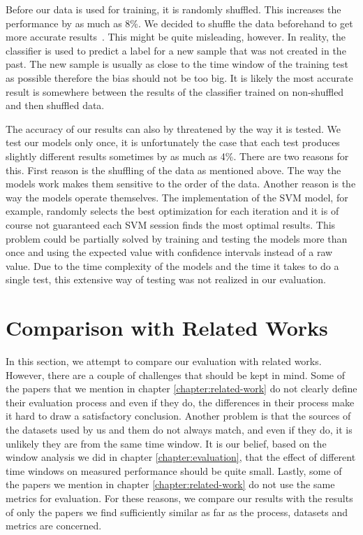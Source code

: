 Before our data is used for training, it is randomly shuffled. This increases the performance by as much as 8\%. We decided to shuffle the data beforehand to get more accurate results~. This might be quite misleading, however. In reality, the classifier is used to predict a label for a new sample that was not created in the past. The new sample is usually as close to the time window of the training test as possible therefore the bias should not be too big. It is likely the most accurate result is somewhere between the results of the classifier trained on non-shuffled and then shuffled data.

The accuracy of our results can also by threatened by the way it is tested. We test our models only once, it is unfortunately the case that each test produces slightly different results sometimes by as much as 4\%. There are two reasons for this. First reason is the shuffling of the data as mentioned above. The way the models work makes them sensitive to the order of the data. Another reason is the way the models operate themselves. The implementation of the SVM model, for example, randomly selects the best optimization for each iteration and it is of course not guaranteed each SVM session finds the most optimal results. This problem could be partially solved by training and testing the models more than once and using the expected value with confidence intervals instead of a raw value. Due to the time complexity of the models and the time it takes to do a single test, this extensive way of testing was not realized in our evaluation.

\section{Comparison with Related Works}

In this section, we attempt to compare our evaluation with related works. However, there are a couple of challenges that should be kept in mind. Some of the papers that we mention in chapter \ref{chapter:related-work} do not clearly define their evaluation process and even if they do, the differences in their process make it hard to draw a satisfactory conclusion. Another problem is that the sources of the datasets used by us and them do not always match, and even if they do, it is unlikely they are from the same time window. It is our belief, based on the window analysis we did in chapter \ref{chapter:evaluation}, that the effect of different time windows on measured performance should be quite small. Lastly, some of the papers we mention in chapter \ref{chapter:related-work} do not use the same metrics for evaluation. For these reasons, we compare our results with the results of only the papers we find sufficiently similar as far as the process, datasets and metrics are concerned.

